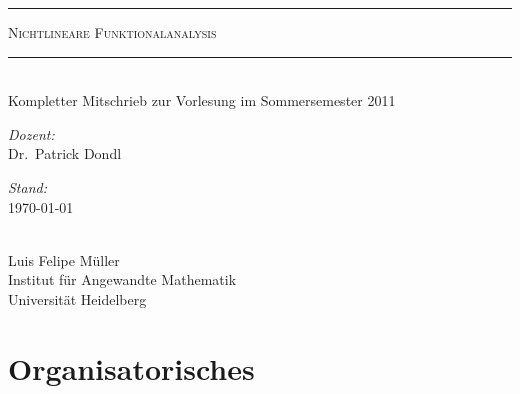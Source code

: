 \documentclass[14pt]{article}
\theoremstyle{plain}
\theoremstyle{nonumberplain}
\begin{document}
\begin{titlepage}
\[ \]
\begin{center}

\hrule\hspace*{1cm\\[3mm]}

\textsc{\Huge Nichtlineare Funktionalanalysis }\\[1cm]
\hrule \hspace*{1cm}\\[3mm]
{\sc Kompletter Mitschrieb zur Vorlesung im Sommersemester 2011}\\[0.5cm]
    \vspace{1cm}
\begin{minipage}{0.4\textwidth}
\begin{flushleft} \large
\emph{Dozent:}\\
    Dr.~Patrick Dondl
\end{flushleft}
\end{minipage}
\begin{minipage}{0.4\textwidth}
\begin{flushright} \large
\emph{Stand:} \\
    \today
\end{flushright}
\end{minipage}
\[ \]\\[1cm]
Luis Felipe Müller\\[1.5cm]
Institut für Angewandte Mathematik\\
Universität Heidelberg
     
\end{center}
\vfill

\end{titlepage}

\newpage


\section*{Organisatorisches}
\end{document}
